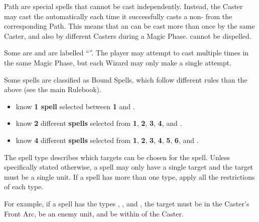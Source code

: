 Path \attributespells{} are special spells that cannot be cast independently. Instead, the Caster may cast the \attributespell{} automatically each time it successfully casts a non-\attributespell{} from the corresponding Path. This means that an \attributespell{} can be cast more than once by the same Caster, and also by different Casters during a Magic Phase. \attributespells{} cannot be dispelled.

\basicsubsubtitle{\replicablespells}

Some \learnedspells{} are \replicablespells{} and are labelled \enquote{\textit{\textbf{\replicablespellnumber}}}. The player may attempt to cast \replicablespells{} multiple times in the same Magic Phase, but each Wizard may only make a single attempt.


Some spells are classified as Bound Spells, which follow different rules than the above (see the main Rulebook).


\begin{itemize}
\item \textbf{\wizardapprentices} know \textbf{1 spell} selected between \textbf{1} and \textbf{\hereditaryspellnumber}.
\item \textbf{\wizardadepts} know \textbf{2} different \textbf{spells} selected from \textbf{1}, \textbf{2}, \textbf{3}, \textbf{4}, and \textbf{\hereditaryspellnumber}.
\item \textbf{\wizardmasters} know \textbf{4} different \textbf{spells} selected from \textbf{1}, \textbf{2}, \textbf{3}, \textbf{4}, \textbf{5}, \textbf{6}, and \textbf{\hereditaryspellnumber}.
\end{itemize}


The spell type describes which targets can be chosen for the spell. Unless specifically stated otherwise, a spell may only have a single target and the target must be a single unit. If a spell has more than one type, apply all the restrictions of each type.

For example, if a spell has the types \direct{}, \hex{}, and , the target must be in the Caster's Front Arc, be an enemy unit, and be within  of the Caster.


